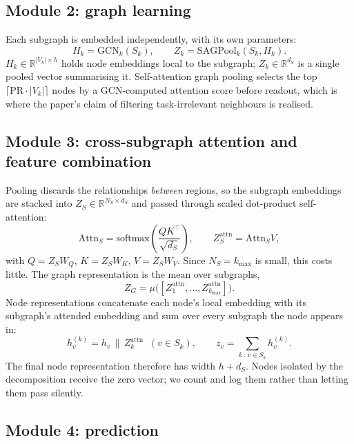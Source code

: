 \documentclass[11pt,a4paper]{article}
\begin{document}
\subsection{Module 2: graph learning}

Each subgraph is embedded independently, with its own parameters:
\begin{equation}
H_k = \mathrm{GCN}_k(S_k), \qquad Z_k = \mathrm{SAGPool}_k(S_k, H_k).
\end{equation}
$H_k \in \mathbb{R}^{|V_k| \times h}$ holds node embeddings local to the subgraph; $Z_k \in
\mathbb{R}^{d_S}$ is a single pooled vector summarising it. Self-attention graph pooling selects the
top $\lceil \mathrm{PR} \cdot |V_k| \rceil$ nodes by a GCN-computed attention score before readout,
which is where the paper's claim of filtering task-irrelevant neighbours is realised.

\subsection{Module 3: cross-subgraph attention and feature combination}

Pooling discards the relationships \emph{between} regions, so the subgraph embeddings are stacked
into $Z_S \in \mathbb{R}^{N_S \times d_S}$ and passed through scaled dot-product self-attention:
\begin{equation}
\mathrm{Attn}_S = \mathrm{softmax}\!\left(\frac{QK^{\top}}{\sqrt{d_S}}\right), \qquad
Z_S^{\mathrm{attn}} = \mathrm{Attn}_S V,
\label{eq:attn}
\end{equation}
with $Q = Z_S W_Q$, $K = Z_S W_K$, $V = Z_S W_V$. Since $N_S = k_{\max}$ is small, this costs little.
The graph representation is the mean over subgraphs,
\begin{equation}
Z_G = \mu\bigl([Z_1^{\mathrm{attn}}, \ldots, Z_{k_{\max}}^{\mathrm{attn}}]\bigr).
\end{equation}
Node representations concatenate each node's local embedding with its subgraph's attended embedding
and sum over every subgraph the node appears in:
\begin{equation}
h_v^{(k)} = h_v \,\|\, Z_k^{\mathrm{attn}} \;\;(v \in S_k), \qquad
z_v = \sum_{k \,:\, v \in S_k} h_v^{(k)}.
\label{eq:merge}
\end{equation}
The final node representation therefore has width $h + d_S$. Nodes isolated by the decomposition
receive the zero vector; we count and log them rather than letting them pass silently.

\subsection{Module 4: prediction}
\end{document}
